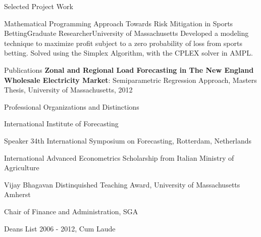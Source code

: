 \documentclass{resume} %
\begin{document}
\begin{rSection}{Selected Project Work}
	\begin{rSubsection}{Mathematical Programming Approach Towards Risk Mitigation in Sports Betting}{}{Graduate Researcher}{University of Massachusetts}
	Developed a modeling technique to maximize profit subject to a zero probability of loss from sports betting. Solved using the Simplex Algorithm, with the CPLEX solver in AMPL.
	\end{rSubsection} 

	\end{rSection}
	


  \begin{rSection}{Publications}
  {\bf  Zonal and Regional Load Forecasting in The New England Wholesale Electricity Market}: Semiparametric Regression Approach, Masters Thesis, University of Massachusetts, 2012
  \end{rSection}



	\begin{rSection}{Professional Organizations and Distinctions}

  \item International Institute of Forecasting
  \item Speaker 34th International Symposium on Forecasting, Rotterdam, Netherlands
  \item International Advanced Econometrics Scholarship from Italian Ministry of Agriculture
  \item Vijay Bhagavan Distinquished Teaching Award, University of Massachusetts Amherst
  \item Chair of Finance and Administration, SGA
  \item Deans List 2006 - 2012, Cum Laude

	\end{rSection}

	
\end{document}
